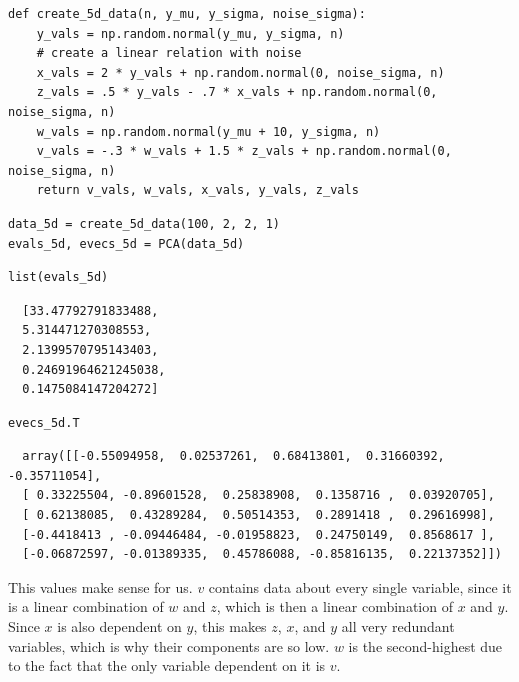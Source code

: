 \documentclass[11pt]{article}
\begin{document}
\begin{verbatim}
def create_5d_data(n, y_mu, y_sigma, noise_sigma):
    y_vals = np.random.normal(y_mu, y_sigma, n)
    # create a linear relation with noise
    x_vals = 2 * y_vals + np.random.normal(0, noise_sigma, n) 
    z_vals = .5 * y_vals - .7 * x_vals + np.random.normal(0, noise_sigma, n)
    w_vals = np.random.normal(y_mu + 10, y_sigma, n)
    v_vals = -.3 * w_vals + 1.5 * z_vals + np.random.normal(0, noise_sigma, n)
    return v_vals, w_vals, x_vals, y_vals, z_vals
\end{verbatim}


\begin{verbatim}
data_5d = create_5d_data(100, 2, 2, 1)
evals_5d, evecs_5d = PCA(data_5d)
\end{verbatim}


\begin{verbatim}
list(evals_5d)
\end{verbatim}

\begin{verbatim}
  [33.47792791833488,
  5.314471270308553,
  2.1399570795143403,
  0.24691964621245038,
  0.1475084147204272]
\end{verbatim}

\begin{verbatim}
evecs_5d.T
\end{verbatim}

\begin{verbatim}
  array([[-0.55094958,  0.02537261,  0.68413801,  0.31660392, -0.35711054],
  [ 0.33225504, -0.89601528,  0.25838908,  0.1358716 ,  0.03920705],
  [ 0.62138085,  0.43289284,  0.50514353,  0.2891418 ,  0.29616998],
  [-0.4418413 , -0.09446484, -0.01958823,  0.24750149,  0.8568617 ],
  [-0.06872597, -0.01389335,  0.45786088, -0.85816135,  0.22137352]])
\end{verbatim}

This values make sense for us. $v$ contains data about every single variable,
since it is a linear combination of $w$ and $z$, which is then a linear
combination of $x$ and $y$. Since $x$ is also dependent on $y$, this makes $z$,
$x$, and $y$ all very redundant variables, which is why their components are so
low. $w$ is the second-highest due to the fact that the only variable
dependent on it is $v$.
\end{document}
